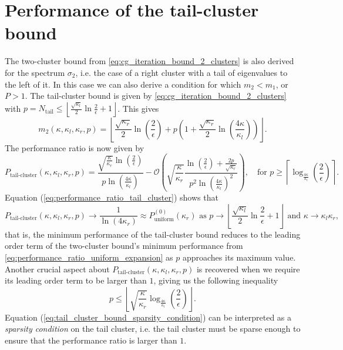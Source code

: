 \section{Performance of the tail-cluster bound}\label{sec:tail_cluster_bound_performance}
The two-cluster bound from \cref{eq:cg_iteration_bound_2_clusters} is also derived for the spectrum $\sigma_2$, i.e. the case of a right cluster with a tail of eigenvalues to the left of it. In this case we can also derive a condition for which $m_2 < m_1$, or $P > 1$. The tail-cluster bound is given by \cref{eq:cg_iteration_bound_2_clusters} with $p = N_{\text{tail}} \leq \left\lfloor\frac{\sqrt{\kappa_l}}{2}\ln{\frac{2}{\epsilon}} + 1 \right\rfloor $. This gives
\[
    m_2(\kappa, \kappa_l, \kappa_r, p) = \left\lfloor
    \frac{\sqrt{\kappa_r}}{2}\ln\left(\frac{2}{\epsilon}\right)
    + p \left(
    1 + \frac{\sqrt{\kappa_r}}{2}\ln\left(\frac{4\kappa}{\kappa_l}\right)
    \right)
    \right\rfloor.
\]
The performance ratio is now given by
\begin{equation}
    P_{\text{tail-cluster}}(\kappa, \kappa_l, \kappa_r, p) = \frac{\sqrt{\frac{\kappa}{\kappa_r}}\ln\left(\frac{2}{\epsilon}\right)}{p\ln\left(\frac{4\kappa}{\kappa_l}\right)} - \mathcal{O}\left(\sqrt{\frac{\kappa}{\kappa_r}}\frac{\ln\left(\frac{2}{\epsilon}\right) + \frac{2p}{\sqrt{\kappa_r}}}{p^2\ln\left(\frac{4\kappa}{\kappa_l}\right)^2}\right), \quad \text{for } p \geq \left\lceil\log_{\frac{4\kappa}{\kappa_l}}\left(\frac{2}{\epsilon}\right)\right\rceil.
    \label{eq:performance_ratio_tail_cluster}
\end{equation}
Equation (\ref{eq:performance_ratio_tail_cluster}) shows that
\[
    P_{\text{tail-cluster}}(\kappa, \kappa_l, \kappa_r, p) \longrightarrow \frac{1}{\ln(4\kappa_r)} \approx P^{(0)}_{\text{uniform}}(\kappa_r) \text{ as } p \to \left\lfloor\frac{\sqrt{\kappa_l}}{2}\ln{\frac{2}{\epsilon}} + 1 \right\rfloor \text{ and } \kappa \to \kappa_l\kappa_r,
\]
that is, the minimum performance of the tail-cluster bound reduces to the leading order term of the two-cluster bound's minimum performance from \cref{eq:performance_ratio_uniform_expansion} as $p$ approaches its maximum value. Another crucial aspect about $P_{\text{tail-cluster}}(\kappa, \kappa_l, \kappa_r, p)$ is recovered when we require its leading order term to be larger than $1$, giving us the following inequality
\begin{equation}
    p \leq \left\lfloor\sqrt{\frac{\kappa}{\kappa_r}}\log_{\frac{4\kappa}{\kappa_l}}\left(\frac{2}{\epsilon}\right)\right\rfloor.
    \label{eq:tail_cluster_bound_sparsity_condition}
\end{equation}
Equation (\ref{eq:tail_cluster_bound_sparsity_condition}) can be interpreted as a \textit{sparsity condition} on the tail cluster, i.e. the tail cluster must be sparse enough to ensure that the performance ratio is larger than $1$.


